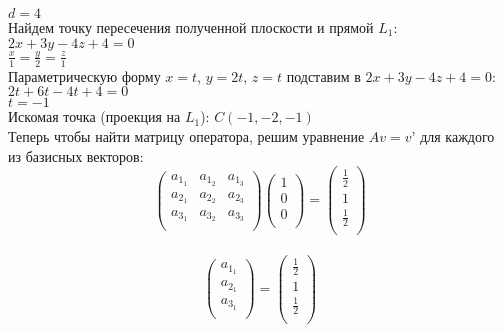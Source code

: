 \documentclass{article}
\begin{document}
    $d = 4$\\
    Найдем точку пересечения полученной плоскости и прямой $L_1$:\\
    $2x + 3y - 4z + 4 = 0$\\
    $\frac{x}{1}=\frac{y}{2}=\frac{z}{1}$\\
    Параметрическую форму $x = t$, $y = 2t$, $z = t$ подставим в $2x + 3y - 4z + 4 = 0$:\\
    $2t + 6t - 4t + 4 = 0$\\
    $t = -1$\\
    Искомая точка (проекция на $L_1$): $C(-1, -2, -1)$\\
    Теперь чтобы найти матрицу оператора, решим уравнение $Av = v’$ для каждого из базисных векторов:\\
    \begin{equation*}
        \begin{pmatrix}
            a_1_1& a_1_2& a_1_3\\
            a_2_1& a_2_2& a_2_3\\
            a_3_1& a_3_2& a_3_3\\
            
        \end{pmatrix}
        \begin{pmatrix}
            1\\
            0\\
            0\\
        \end{pmatrix}
        =
        \begin{pmatrix}
            \frac{1}{2}\\
            1\\
            \frac{1}{2}\\
        \end{pmatrix}
    \end{equation*}
    \\
    \begin{equation*}
        \begin{pmatrix}
            a_1_1\\
            a_2_1\\
            a_3_1\\
        \end{pmatrix}
        =
        \begin{pmatrix}
            \frac{1}{2}\\
            1\\
            \frac{1}{2}\\
        \end{pmatrix}
    \end{equation*}
\end{document}
